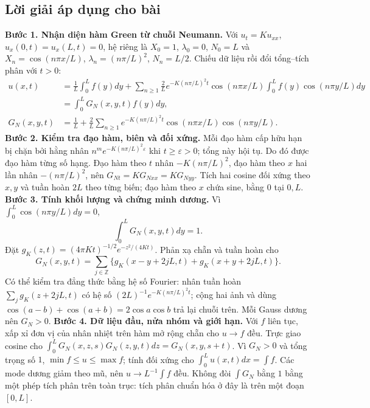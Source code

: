 \documentclass[10pt,a4paper]{article}
\begin{document}
\subsection*{Lời giải áp dụng cho bài}
\textbf{Bước 1. Nhận diện hàm Green từ chuỗi Neumann.}
Với $u_t=Ku_{xx}$, $u_x(0,t)=u_x(L,t)=0$, hệ riêng là $X_0=1$, $\lambda_0=0$, $N_0=L$ và $X_n=\cos(n\pi x/L)$, $\lambda_n=(n\pi/L)^2$, $N_n=L/2$. Chiếu dữ liệu rồi đổi tổng–tích phân với $t>0$:
\begin{align*}
u(x,t)&=\frac1L\int_0^Lf(y)dy+
\sum_{n\ge1}\frac2L e^{-K(n\pi/L)^2t}\cos(n\pi x/L)\int_0^Lf(y)\cos(n\pi y/L)dy\\
&=\int_0^LG_N(x,y,t)f(y)dy,\\
G_N(x,y,t)&=\frac1L+\frac2L\sum_{n\ge1}e^{-K(n\pi/L)^2t}
\cos(n\pi x/L)\cos(n\pi y/L).
\end{align*}
\textbf{Bước 2. Kiểm tra đạo hàm, biên và đối xứng.}
Mỗi đạo hàm cấp hữu hạn bị chặn bởi hằng nhân $n^m e^{-K(n\pi/L)^2\varepsilon}$ khi $t\ge\varepsilon>0$; tổng này hội tụ. Do đó được đạo hàm từng số hạng. Đạo hàm theo $t$ nhân $-K(n\pi/L)^2$, đạo hàm theo $x$ hai lần nhân $-(n\pi/L)^2$, nên $G_{Nt}=KG_{Nxx}=KG_{Nyy}$. Tích hai cosine đối xứng theo $x,y$ và tuần hoàn $2L$ theo từng biến; đạo hàm theo $x$ chứa sine, bằng $0$ tại $0,L$.
\textbf{Bước 3. Tính khối lượng và chứng minh dương.} Vì $\int_0^L\cos(n\pi y/L)dy=0$,
\[\int_0^LG_N(x,y,t)dy=1.\]
Đặt $g_K(z,t)=(4\pi Kt)^{-1/2}e^{-z^2/(4Kt)}$. Phản xạ chẵn và tuần hoàn cho
\[G_N(x,y,t)=\sum_{j\in\mathbb Z}\{g_K(x-y+2jL,t)+g_K(x+y+2jL,t)\}.\]
Có thể kiểm tra đẳng thức bằng hệ số Fourier: nhân tuần hoàn $\sum_jg_K(z+2jL,t)$ có hệ số $(2L)^{-1}e^{-K(n\pi/L)^2t}$; cộng hai ảnh và dùng $\cos(a-b)+\cos(a+b)=2\cos a\cos b$ trả lại chuỗi trên. Mỗi Gauss dương nên $G_N>0$.
\textbf{Bước 4. Dữ liệu đầu, nửa nhóm và giới hạn.} Với $f$ liên tục, xấp xỉ đơn vị của nhân nhiệt trên hàm mở rộng chẵn cho $u\to f$ đều. Trực giao cosine cho $\int_0^LG_N(x,z,s)G_N(z,y,t)dz=G_N(x,y,s+t)$. Vì $G_N>0$ và tổng trọng số $1$, $\min f\le u\le\max f$; tính đối xứng cho $\int_0^Lu(x,t)dx=\int f$. Các mode dương giảm theo mũ, nên $u\to L^{-1}\int f$ đều. Không đòi $\int G_N$ bằng $1$ bằng một phép tích phân trên toàn trục: tích phân chuẩn hóa ở đây là trên một đoạn $[0,L]$.
\end{document}

